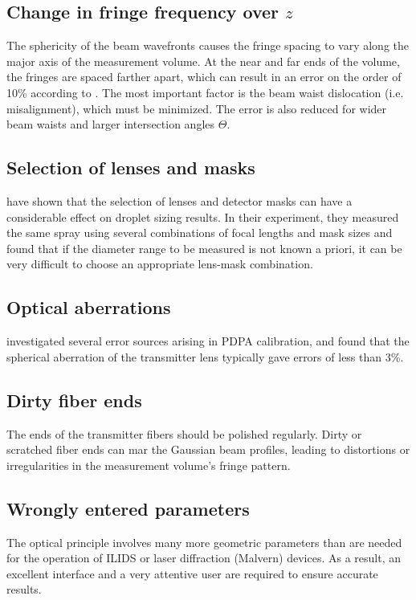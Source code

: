 \documentclass[11.5pt]{book}
\begin{document}
\subsection{Change in fringe frequency over $z$}
The sphericity of the beam wavefronts causes the fringe spacing to vary along
the major axis of the measurement volume. At the near and far ends of the
volume, the fringes are spaced farther apart, which can result in an error on
the order of 10\% according to \citet{Albrecht03}. The most important factor is
the beam waist dislocation (i.e. misalignment), which must be minimized. The
error is also reduced for wider beam waists and larger intersection angles
$\Theta$.

\subsection{Selection of lenses and masks}
\citet{Davis04} have shown that the selection of lenses and detector masks
can have a considerable effect on droplet sizing results. In their experiment,
they measured the same spray using several combinations of focal lengths and mask
sizes and found that if the diameter range to be measured is not known a priori,
it can be very difficult to choose an appropriate lens-mask combination.

\subsection{Optical aberrations}
\citet{Dressler90} investigated several error sources arising in PDPA
calibration, and found that the spherical aberration of the transmitter lens
typically gave errors of less than 3\%.

\subsection{Dirty fiber ends}
The ends of the transmitter fibers should be polished regularly. Dirty or
scratched fiber ends can mar the Gaussian beam profiles, leading to distortions
or irregularities in the measurement volume's fringe pattern.

\subsection{Wrongly entered parameters}
The optical principle involves many more geometric parameters than are needed
for the operation of ILIDS or laser diffraction (Malvern) devices. As a result, an
excellent interface and a very attentive user are required to ensure accurate
results.
\end{document}
